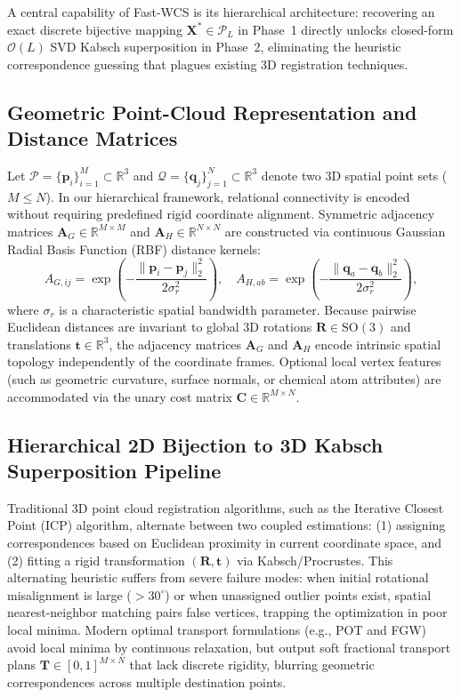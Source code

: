 \documentclass[conference]{IEEEtran}
\begin{document}
A central capability of Fast-WCS is its hierarchical architecture: recovering an exact discrete bijective mapping $\mathbf{X}^* \in \mathcal{P}_L$ in Phase~1 directly unlocks closed-form $\mathcal{O}(L)$ SVD Kabsch superposition in Phase~2, eliminating the heuristic correspondence guessing that plagues existing 3D registration techniques.

\subsection{Geometric Point-Cloud Representation and Distance Matrices}

Let $\mathcal{P} = \{\mathbf{p}_i\}_{i=1}^M \subset \mathbb{R}^3$ and $\mathcal{Q} = \{\mathbf{q}_j\}_{j=1}^N \subset \mathbb{R}^3$ denote two 3D spatial point sets ($M \le N$). In our hierarchical framework, relational connectivity is encoded without requiring predefined rigid coordinate alignment. Symmetric adjacency matrices $\mathbf{A}_G \in \mathbb{R}^{M \times M}$ and $\mathbf{A}_H \in \mathbb{R}^{N \times N}$ are constructed via continuous Gaussian Radial Basis Function (RBF) distance kernels:
\begin{equation}
A_{G, ij} = \exp\left(-\frac{\|\mathbf{p}_i - \mathbf{p}_j\|_2^2}{2\sigma_r^2}\right), \quad A_{H, ab} = \exp\left(-\frac{\|\mathbf{q}_a - \mathbf{q}_b\|_2^2}{2\sigma_r^2}\right),
\label{eq:rbf_adj}
\end{equation}
where $\sigma_r$ is a characteristic spatial bandwidth parameter. Because pairwise Euclidean distances are invariant to global 3D rotations $\mathbf{R} \in \mathrm{SO}(3)$ and translations $\mathbf{t} \in \mathbb{R}^3$, the adjacency matrices $\mathbf{A}_G$ and $\mathbf{A}_H$ encode intrinsic spatial topology independently of the coordinate frames. Optional local vertex features (such as geometric curvature, surface normals, or chemical atom attributes) are accommodated via the unary cost matrix $\mathbf{C} \in \mathbb{R}^{M \times N}$.

\subsection{Hierarchical 2D Bijection to 3D Kabsch Superposition Pipeline}

Traditional 3D point cloud registration algorithms, such as the Iterative Closest Point (ICP) algorithm, alternate between two coupled estimations: (1) assigning correspondences based on Euclidean proximity in current coordinate space, and (2) fitting a rigid transformation $(\mathbf{R}, \mathbf{t})$ via Kabsch/Procrustes. This alternating heuristic suffers from severe failure modes: when initial rotational misalignment is large ($> 30^\circ$) or when unassigned outlier points exist, spatial nearest-neighbor matching pairs false vertices, trapping the optimization in poor local minima. Modern optimal transport formulations (e.g., POT and FGW) avoid local minima by continuous relaxation, but output soft fractional transport plans $\mathbf{T} \in [0, 1]^{M \times N}$ that lack discrete rigidity, blurring geometric correspondences across multiple destination points.
\end{document}
